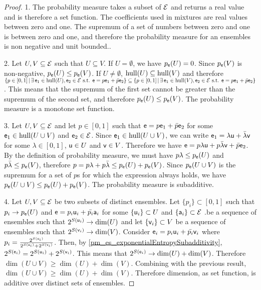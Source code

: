 \begin{proof}
	1. The probability measure takes a subset of $\Ens$ and returns a real value and is therefore a set function. The coefficients used in mixtures are real values between zero and one. The supremum of a set of numbers between zero and one is between zero and one, and therefore the probability measure for an ensembles is non negative and unit bounded.. 
	
	2. Let $U, V \subseteq \Ens$ such that $U \subseteq V$. If $U = \emptyset$, we have $p_{\ens}(U) = 0$. Since $p_{\ens}(V)$ is non-negative, $p_{\ens}(U) \leq p_{\ens}(V)$. If $U \neq \emptyset$, $\hull(U) \subseteq \hull(V)$ and therefore $\{ p \in [0,1] \, | \, \exists \, \ens_1 \in \hull(U), \ens_2 \in \Ens \text{ s.t. }  \ens = p \ens_1 + \bar{p} \ens_2 \} \subseteq \{ p \in [0,1] \, | \, \exists \, \ens_1 \in \hull(V), \ens_2 \in \Ens \text{ s.t. }  \ens = p \ens_1 + \bar{p} \ens_2 \}$. This means that the supremum of the first set cannot be greater than the supremum of the second set, and therefore $p_{\ens}(U) \leq p_{\ens}(V)$. The probability measure is a monotone set function.
	
	3. Let $U, V \subseteq \Ens$ and let $p \in [0,1]$ such that $\ens = p \ens_1 + \bar{p} \ens_2$ for some $\ens_1 \in \hull(U \cup V)$ and $\ens_2 \in \Ens$. Since $\ens_1 \in \hull(U \cup V)$, we can write $\ens_1 = \lambda \ens[u] + \bar{\lambda} \ens[v]$ for some $\lambda \in [0,1]$, $\ens[u] \in U$ and $\ens[v] \in V$. Therefore we have $\ens = p \lambda \ens[u] + p \bar{\lambda} \ens[v] + \bar{p} \ens_2$. By the definition of probability measure, we must have $p\lambda \leq p_{\ens}(U)$ and $p\bar{\lambda} \leq p_{\ens}(V)$, therefore $p = p\lambda + p\bar{\lambda} \leq p_{\ens}(U) + p_{\ens}(V)$. 	Since $p_{\ens}(U \cup V)$ is the supremum for a set of $p$s for which the expression always holds, we have $p_{\ens}(U \cup V) \leq p_{\ens}(U) + p_{\ens}(V)$. The probability measure is subadditive.
	
	4. Let $U, V \subseteq \Ens$ be two subsets of distinct ensembles. Let $\{p_i\} \subset [0,1]$ such that $p_i \to p_{\ens}(U)$ and $\ens = p_i \ens[u]_i + \bar{p_i} \ens[a]_i$ for some $\{\ens[u]_i\} \subset U$ and $\{\ens[a]_i\} \subset \Ens$ .be a sequence of ensembles such that $2^{S(\ens[u]_i)} \to \dim(U)$ and let $\{\ens[v]_i\} \subset V$ be a sequence of ensembles such that $2^{S(\ens[v]_i)} \to \dim(V)$. Consider $\ens_i = p_i \ens[u]_i + \bar{p_i} \ens[v]_i$ where $p_i = \frac{2^{S(\ens[u]_i)}}{2^{S(\ens[u]_i)} + 2^{S(\ens[v]_i)}}$. Then, by \ref{pm_es_exponentialEntropySubadditivity}, $2^{S(\ens_i)} = 2^{S(\ens[u]_i)} + 2^{S(\ens[v]_i)}$. This means that $2^{S(\ens_i)} \to \dim(U) + \dim(V)$. Therefore $\dim(U \cup V) \geq \dim(U) + \dim(V)$. Combining with the previous result, $\dim(U \cup V) \geq \dim(U) + \dim(V)$. Therefore dimension, as set function, is additive over distinct sets of ensembles.
\end{proof}

